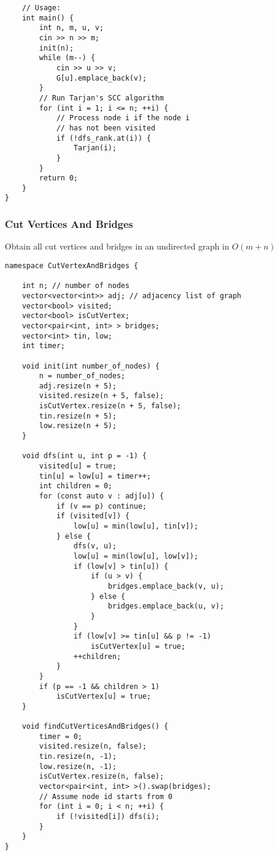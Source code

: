 \documentclass[10pt]{article}{\twocolumn}
\begin{document}
\begin{lstlisting}
    // Usage:
    int main() {
        int n, m, u, v;
        cin >> n >> m;
        init(n);
        while (m--) {
            cin >> u >> v;
            G[u].emplace_back(v);
        }
        // Run Tarjan's SCC algorithm
        for (int i = 1; i <= n; ++i) {
            // Process node i if the node i 
            // has not been visited
            if (!dfs_rank.at(i)) {
                Tarjan(i);
            }
        }
        return 0;
    }
}
\end{lstlisting}

\subsubsection{Cut Vertices And Bridges}
Obtain all cut vertices and bridges in an undirected graph in $O(m+n)$
\begin{lstlisting}
namespace CutVertexAndBridges {

    int n; // number of nodes
    vector<vector<int>> adj; // adjacency list of graph
    vector<bool> visited;
    vector<bool> isCutVertex;
    vector<pair<int, int> > bridges;
    vector<int> tin, low;
    int timer;

    void init(int number_of_nodes) {
        n = number_of_nodes;
        adj.resize(n + 5);
        visited.resize(n + 5, false);
        isCutVertex.resize(n + 5, false);
        tin.resize(n + 5);
        low.resize(n + 5);
    }

    void dfs(int u, int p = -1) {
        visited[u] = true;
        tin[u] = low[u] = timer++;
        int children = 0;
        for (const auto v : adj[u]) {
            if (v == p) continue;
            if (visited[v]) {
                low[u] = min(low[u], tin[v]);
            } else {
                dfs(v, u);
                low[u] = min(low[u], low[v]);
                if (low[v] > tin[u]) {
                    if (u > v) {
                        bridges.emplace_back(v, u);
                    } else {
                        bridges.emplace_back(u, v);
                    }
                }
                if (low[v] >= tin[u] && p != -1)
                    isCutVertex[u] = true;
                ++children;
            }
        }
        if (p == -1 && children > 1)
            isCutVertex[u] = true;
    }

    void findCutVerticesAndBridges() {
        timer = 0;
        visited.resize(n, false);
        tin.resize(n, -1);
        low.resize(n, -1);
        isCutVertex.resize(n, false);
        vector<pair<int, int> >().swap(bridges);
        // Assume node id starts from 0
        for (int i = 0; i < n; ++i) {
            if (!visited[i]) dfs(i);
        }
    }
}
\end{lstlisting}
\end{document}
